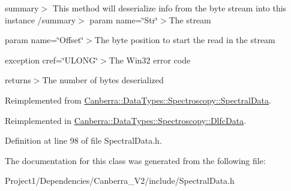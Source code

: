 summary$>$ This method will deserialize info from the byte stream into this instance /summary$>$ param name=\char`\"{}\+Str\char`\"{}$>$The stream

param name=\char`\"{}\+Offset\char`\"{}$>$The byte position to start the read in the stream

exception cref=\char`\"{}\+U\+L\+O\+N\+G\char`\"{}$>$The Win32 error code

returns$>$The number of bytes deserialized

Reimplemented from \hyperlink{class_canberra_1_1_data_types_1_1_spectroscopy_1_1_spectral_data_ab52ed322617b69a8777302d6b7ccbe8a_ab52ed322617b69a8777302d6b7ccbe8a}{Canberra\+::\+Data\+Types\+::\+Spectroscopy\+::\+Spectral\+Data}.



Reimplemented in \hyperlink{class_canberra_1_1_data_types_1_1_spectroscopy_1_1_dlfc_data_aacc250b1d3e769eddddad762028110de_aacc250b1d3e769eddddad762028110de}{Canberra\+::\+Data\+Types\+::\+Spectroscopy\+::\+Dlfc\+Data}.



Definition at line 98 of file Spectral\+Data.\+h.



The documentation for this class was generated from the following file\+:\begin{DoxyCompactItemize}
\item 
Project1/\+Dependencies/\+Canberra\+\_\+\+V2/include/Spectral\+Data.\+h\end{DoxyCompactItemize}
